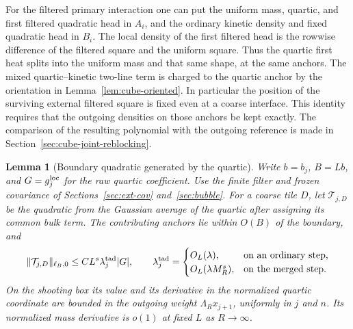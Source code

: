 \documentclass[11pt]{article}
\newtheorem{lemma}[theorem]{Lemma}
\theoremstyle{definition}
\begin{document}
For the filtered primary interaction one can put the uniform mass,
quartic, and first filtered quadratic head in \(A_i\), and the
ordinary kinetic density and fixed quadratic head in \(B_i\).
The local density of the first filtered head is the rowwise
difference of the filtered square and the uniform square. Thus
the quartic first heat splits into the uniform mass and that
same shape, at the same anchors. The mixed quartic--kinetic
two-line term is charged to the quartic anchor by the orientation
in Lemma~\ref{lem:cube-oriented}. In particular the position of
the surviving external filtered square is fixed even at a
coarse interface. This identity requires that the outgoing densities
on those anchors be kept exactly. The comparison of the resulting
polynomial with the outgoing reference is made in
Section~\ref{sec:cube-joint-reblocking}.

\begin{lemma}[Boundary quadratic generated by the quartic]
\label{lem:new-boundary-quadratic}
Write \(b=b_j\), \(B=Lb\), and \(G=g_j^{\rm loc}\) for the raw
quartic coefficient. Use the finite filter and frozen covariance of
Sections~\ref{sec:ext-cov} and~\ref{sec:bubble}. For a coarse tile
\(D\), let \(\mathcal T_{j,D}\) be the quadratic from the Gaussian
average of the quartic after assigning its common bulk term.
The contributing anchors lie within \(O(B)\) of the boundary, and
\begin{equation}
 \|\mathcal T_{j,D}\|_{\ell_B,0}
 \le C L^s\lambda_j^{\rm tad}|G|,
 \qquad
 \lambda_j^{\rm tad}=
 \begin{cases}
 O_L(\lambda),&\text{on an ordinary step},\\
 O_L(\lambda M_R^s),&\text{on the merged step}.
 \end{cases}
 \label{eq:boundary-tadpole-source}
\end{equation}
On the shooting box its value and its derivative in the normalized quartic coordinate
are bounded in the outgoing weight \(\Lambda_R x_{j+1}\), uniformly
in \(j\) and \(n\). Its normalized mass derivative is \(o(1)\) at fixed
\(L\) as \(R\to\infty\).
\end{lemma}
\end{document}
